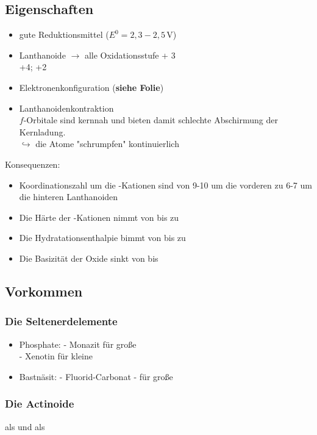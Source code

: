 \documentclass[a4paper, fleqn]{article}
\begin{document}
\subsection{Eigenschaften}
\begin{itemize}
    \item gute Reduktionsmittel ($E^0 = 2,3-2,5\,\mathrm{V}$)
    \item Lanthanoide $\rightarrow$ alle Oxidationsstufe + 3\\  +4;  +2
    \item Elektronenkonfiguration (\textbf{siehe Folie})
    \item Lanthanoidenkontraktion\\ $f$-Orbitale sind kernnah und bieten damit schlechte Abschirmung der Kernladung.\\ $\hookrightarrow$ die Atome "schrumpfen" kontinuierlich
\end{itemize}
Konsequenzen:
\begin{itemize}
    \item Koordinationszahl um die -Kationen sind von 9-10 um die vorderen zu 6-7 um die hinteren Lanthanoiden
    \item Die Härte der -Kationen nimmt von  bis  zu
    \item Die Hydratationsenthalpie bimmt von  bis  zu
    \item Die Basizität der Oxide sinkt von  bis 
\end{itemize}

\subsection{Vorkommen}
\subsubsection{Die Seltenerdelemente}
\begin{itemize}
    \item Phosphate:  - Monazit für große \\ - Xenotin für kleine 
    \item Bastnäsit:  - Fluorid-Carbonat - für große 
\end{itemize}

\subsubsection{Die Actinoide}
 als  und  als 
\end{document}
